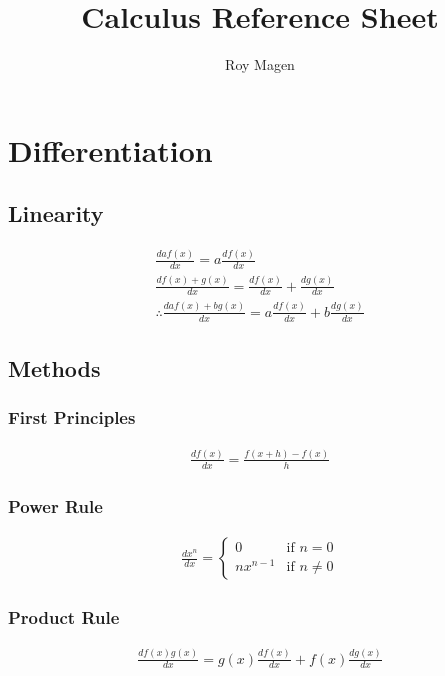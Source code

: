 \documentclass[12pt]{article}
\title{Calculus Reference Sheet}
\author{Roy Magen}
\date{ }
\begin{document}
	\newcommand{\deriv}[2][x]{\frac{d #2}{d#1}}
	\newcommand{\antider}[2][x]{\int #2\,d#1}
	\newcommand{\defint}[4][x]{\int_#2^#3 #4 d#1}

	\maketitle
	
	\tableofcontents

	\section{Differentiation}
		\subsection{Linearity}
			\begin{gather}
				\deriv{af(x)} = a\deriv{f(x)} \\
				\deriv{f(x) + g(x)} = \deriv{f(x)} +
				\deriv{g(x)} \\
				\therefore \deriv{af(x) + bg(x)} = a\deriv{f(x)}
				+ b\deriv{g(x)}
			\end{gather}
		\subsection{Methods}
			\subsubsection{First Principles}
				\begin{gather}
					\deriv{f(x)} = \frac{f(x + h) -
					f(x)}{h}
				\end{gather}
			\subsubsection{Power Rule}
				\begin{gather}
					\deriv{x^n} =
						\begin{cases}
							0 & \text{if } n = 0 \\
							nx^{n-1} & \text{if } n
							\neq 0
						\end{cases}
				\end{gather}
			\subsubsection{Product Rule}
				\begin{gather}
					\deriv{f(x)g(x)} = g(x)\deriv{f(x)} +
					f(x)\deriv{g(x)}
				\end{gather}
\end{document}
